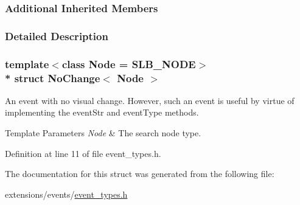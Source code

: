 \subsubsection*{Additional Inherited Members}


\subsubsection{Detailed Description}
\subsubsection*{template$<$class Node = S\+L\+B\+\_\+\+N\+O\+DE$>$\\*
struct No\+Change$<$ Node $>$}

An event with no visual change. However, such an event is useful by virtue of implementing the {\ttfamily event\+Str} and {\ttfamily event\+Type} methods. 


\begin{DoxyTemplParams}{Template Parameters}
{\em Node} & The search node type. \\
\hline
\end{DoxyTemplParams}


Definition at line 11 of file event\+\_\+types.\+h.



The documentation for this struct was generated from the following file\+:\begin{DoxyCompactItemize}
\item 
extensions/events/\hyperlink{event__types_8h}{event\+\_\+types.\+h}\end{DoxyCompactItemize}
